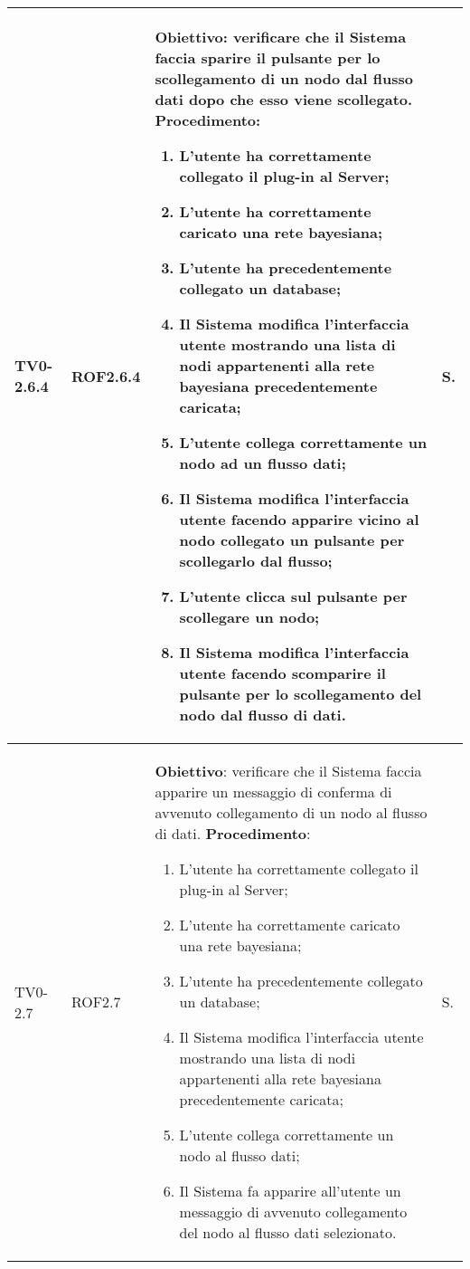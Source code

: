 \begin{longtable}{|C{.15\textwidth}|C{.13\textwidth}|m{.65\textwidth}|C{.08\textwidth}|}
TV0-2.6.4 & ROF2.6.4 &
	\textbf{Obiettivo}: verificare che il Sistema faccia sparire il pulsante per lo scollegamento di un nodo dal flusso dati dopo che esso viene scollegato. \newline
	\textbf{Procedimento}:
	\begin{enumerate}
		\item L'utente ha correttamente collegato il plug-in al Server;
		\item L'utente ha correttamente caricato una rete bayesiana;
		\item L'utente ha precedentemente collegato un database;
		\item Il Sistema modifica l'interfaccia utente mostrando una lista di nodi appartenenti alla rete bayesiana precedentemente caricata;
		\item L'utente collega correttamente un nodo ad un flusso dati;
		\item Il Sistema modifica l'interfaccia utente facendo apparire vicino al nodo collegato un pulsante per scollegarlo dal flusso;
		\item L'utente clicca sul pulsante per scollegare un nodo;
		\item Il Sistema modifica l'interfaccia utente facendo scomparire il pulsante per lo scollegamento del nodo dal flusso di dati. 
	\end{enumerate}
	& S. \\
\hline

TV0-2.7 & ROF2.7 &
	\textbf{Obiettivo}: verificare che il Sistema faccia apparire un messaggio di conferma di avvenuto collegamento di un nodo al flusso di dati. \newline
	\textbf{Procedimento}:
	\begin{enumerate}
		\item L'utente ha correttamente collegato il plug-in al Server;
		\item L'utente ha correttamente caricato una rete bayesiana;
		\item L'utente ha precedentemente collegato un database;
		\item Il Sistema modifica l'interfaccia utente mostrando una lista di nodi appartenenti alla rete bayesiana precedentemente caricata;
		\item L'utente collega correttamente un nodo al flusso dati;
		\item Il Sistema fa apparire all'utente un messaggio di avvenuto collegamento del nodo al flusso dati selezionato.
	\end{enumerate}
	& S. \\
\hline


\end{longtable}
